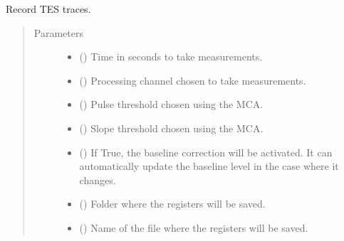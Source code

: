 \documentclass[letterpaper,10pt,english]{sphinxmanual}
\begin{document}
\begin{fulllineitems}
\label{\detokenize{tes:tes.data_acquisition.trace_drive}}
\sphinxAtStartPar
Record TES traces.
\begin{quote}\begin{description}
\item[{Parameters}] \leavevmode\begin{itemize}
\item {} 
\sphinxAtStartPar
{} () \textendash{} Time in seconds to take measurements.

\item {} 
\sphinxAtStartPar
{} () \textendash{} Processing channel chosen to take measurements.

\item {} 
\sphinxAtStartPar
{} () \textendash{} Pulse threshold chosen using the MCA.

\item {} 
\sphinxAtStartPar
{} () \textendash{} Slope threshold chosen using the MCA.

\item {} 
\sphinxAtStartPar
{} () \textendash{} If True, the baseline correction will be activated.
It can automatically update the baseline level in
the case where it changes.

\item {} 
\sphinxAtStartPar
{} () \textendash{} Folder where the registers will be saved.

\item {} 
\sphinxAtStartPar
{} () \textendash{} Name of the file where the registers will be saved.


\end{itemize}
\end{description}
\end{quote}
\end{fulllineitems}
\end{document}
